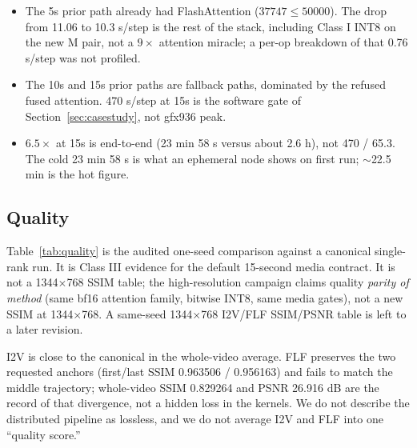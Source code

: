 \documentclass[11pt]{article}
\begin{document}
\begin{itemize}
\item The 5s prior path already had FlashAttention ($37747 \leq 50000$). The drop from 11.06 to 10.3 s/step is the rest of the stack, including Class I INT8 on the new M pair, not a $9\times$ attention miracle; a per-op breakdown of that 0.76 s/step was not profiled.
\item The 10s and 15s prior paths are fallback paths, dominated by the refused fused attention. 470 s/step at 15s is the software gate of Section~\ref{sec:casestudy}, not gfx936 peak.
\item $6.5\times$ at 15s is end-to-end (23 min 58 s versus about 2.6 h), not 470 / 65.3. The cold 23 min 58 s is what an ephemeral node shows on first run; $\sim$22.5 min is the hot figure.
\end{itemize}

\subsection{Quality}
\label{sec:quality}

Table~\ref{tab:quality} is the audited one-seed comparison against a canonical single-rank run. It is Class III evidence for the default 15-second media contract. It is not a 1344$\times$768 SSIM table; the high-resolution campaign claims quality \emph{parity of method} (same bf16 attention family, bitwise INT8, same media gates), not a new SSIM at 1344$\times$768. A same-seed 1344$\times$768 I2V/FLF SSIM/PSNR table is left to a later revision.

\begin{table}[htbp]
\centering
\caption{Audited one-seed quality versus canonical single-rank.}
\label{tab:quality}
\small
\setlength{\tabcolsep}{4pt}
\end{table}

I2V is close to the canonical in the whole-video average. FLF preserves the two requested anchors (first/last SSIM 0.963506 / 0.956163) and fails to match the middle trajectory; whole-video SSIM 0.829264 and PSNR 26.916 dB are the record of that divergence, not a hidden loss in the kernels. We do not describe the distributed pipeline as lossless, and we do not average I2V and FLF into one ``quality score.''
\end{document}
